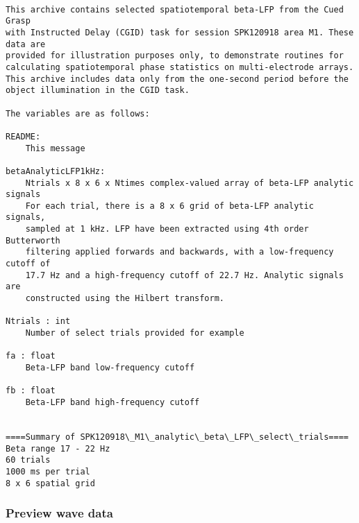 \documentclass[11pt]{article}
\begin{document}
    \begin{Verbatim}[commandchars=\\\{\}]

This archive contains selected spatiotemporal beta-LFP from the Cued Grasp 
with Instructed Delay (CGID) task for session SPK120918 area M1. These data are
provided for illustration purposes only, to demonstrate routines for 
calculating spatiotemporal phase statistics on multi-electrode arrays.
This archive includes data only from the one-second period before the 
object illumination in the CGID task.

The variables are as follows:

README:
    This message

betaAnalyticLFP1kHz:
    Ntrials x 8 x 6 x Ntimes complex-valued array of beta-LFP analytic signals
    For each trial, there is a 8 x 6 grid of beta-LFP analytic signals, 
    sampled at 1 kHz. LFP have been extracted using 4th order Butterworth 
    filtering applied forwards and backwards, with a low-frequency cutoff of 
    17.7 Hz and a high-frequency cutoff of 22.7 Hz. Analytic signals are 
    constructed using the Hilbert transform.

Ntrials : int
    Number of select trials provided for example

fa : float
    Beta-LFP band low-frequency cutoff

fb : float
    Beta-LFP band high-frequency cutoff


====Summary of SPK120918\_M1\_analytic\_beta\_LFP\_select\_trials====
Beta range 17 - 22 Hz
60 trials
1000 ms per trial
8 x 6 spatial grid

    \end{Verbatim}

    \subsubsection{Preview wave data}\label{preview-wave-data}
\end{document}
